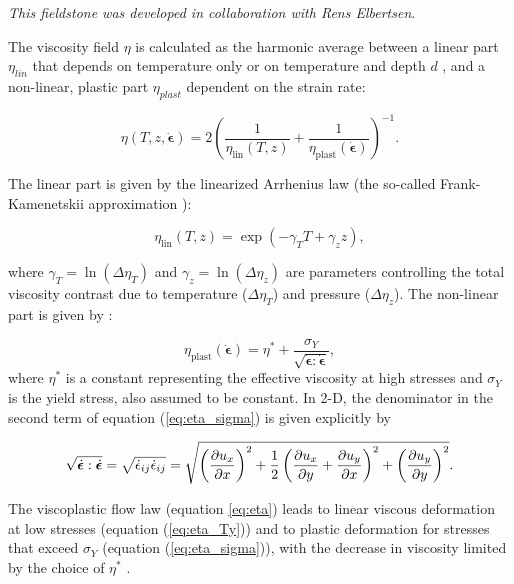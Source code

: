 {\sl This fieldstone was developed in collaboration with Rens Elbertsen}. 

The viscosity field $\eta$ is calculated as the harmonic average between a linear part $\eta_{lin}$ 
that depends on temperature only or on temperature and depth $d$ , and a non-linear,
plastic part $\eta_{plast}$ dependent on the strain rate:

\begin{equation}
\eta(T,z,\dot{\boldsymbol{\epsilon}}) = 
2 \left(\frac{1}{\eta_\text{lin}(T,z)} + \frac{1}{\eta_\text{plast}(\dot{\boldsymbol{\epsilon}})} \right)^{-1}. 
\label{eq:eta}
\end{equation}

The linear part is given by the linearized Arrhenius law (the so-called Frank-Kamenetskii approximation \cite{fran69}):

\begin{equation}
\eta_\text{lin} (T,z) = \exp(-\gamma_T T + \gamma_{z} z), \label{eq:eta_Ty}
\end{equation}

where $\gamma_T = \ln ( \Delta\eta_T)$ and $\gamma_{z}=\ln(\Delta\eta_{z})$ are parameters controlling the total viscosity 
contrast due to temperature ($\Delta\eta_T$) and pressure ($\Delta\eta_{z}$). The non-linear part is given by \cite{trha98,trha98b}: 

\begin{equation}
\eta_\text{plast} (\dot{\boldsymbol{\epsilon}}) 
= \eta^{*} + \frac{\sigma_Y}{\sqrt{\dot{\boldsymbol{\epsilon}}:\dot{\boldsymbol{\epsilon}}}}, \label{eq:eta_sigma}
\end{equation}
where $\eta^*$ is a constant representing the effective viscosity at high stresses \cite{stlh14} and $\sigma_Y$ is the yield stress, also assumed to be constant. In 2-D, the denominator in the second term of equation (\ref{eq:eta_sigma}) is given explicitly by

\begin{equation}
\sqrt{\dot{\boldsymbol{\epsilon}}:\dot{\boldsymbol{\epsilon}}} 
= \sqrt{\dot{\epsilon}_{ij} \dot{\epsilon}_{ij} } \\
 = \sqrt{\left( \frac{\partial u_x}{\partial x} \right)^2 + \frac{1}{2} \left( \frac{\partial u_x}{\partial y} 
+ \frac{\partial u_y}{\partial x} \right)^2 + \left( \frac{\partial u_y}{\partial y} \right)^2  }.
\end{equation}

The viscoplastic flow law (equation \ref{eq:eta}) leads to linear viscous deformation at low stresses (equation (\ref{eq:eta_Ty})) and to plastic deformation for stresses that exceed $\sigma_Y$ (equation (\ref{eq:eta_sigma})), with the decrease in viscosity limited by the choice of $\eta^{*}$ \cite{stlh14}.


